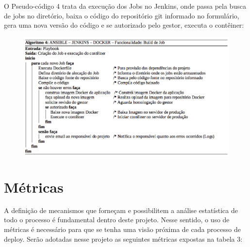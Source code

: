 \vspace*{2cm}
    
O Pseudo-código 4 trata da execução dos Jobs no Jenkins, onde passa pela busca de jobs no diretório, baixa o código do repositório git informado no formulário, gera uma nova versão do código e se autorizado pelo gestor, executa o contêiner:	
\begin{figure}[htb]
	\centering
	\includegraphics[width=1\linewidth]{imagens/algoritmo4}
\end{figure}



    \pagebreak[4]
\section{Métricas}

A definição de mecanismos que forneçam e possibilitem a análise estatística de todo o processo é fundamental dentro deste projeto. Nesse sentido, o uso de métricas é necessário para que se tenha uma visão próxima de cada processo de deploy. Serão adotadas nesse projeto as seguintes métricas expostas na tabela 3:



